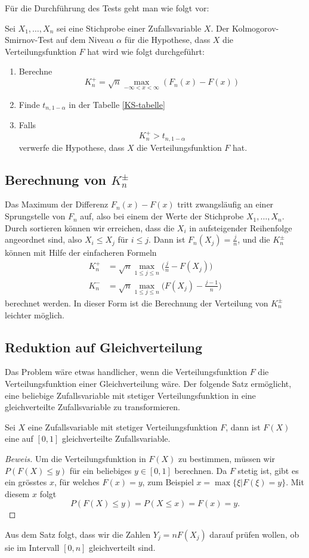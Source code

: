 Für die Durchführung des Tests geht man wie folgt vor:
\begin{satz} Sei $X_1,\dots,X_n$ sei eine Stichprobe einer Zufallsvariable $X$.
Der Kolmogorov-Smirnov-Test auf dem Niveau $\alpha$ für die Hypothese,
dass $X$ die Verteilungsfunktion $F$ hat wird wie folgt durchgeführt:
\begin{enumerate}
\item Berechne
\[
K_n^+ = \sqrt{n}\max_{-\infty<x<\infty} (F_n(x)-F(x))
\]
\item Finde $t_{n,1-\alpha}$ in der Tabelle \ref{KS-tabelle}
\item Falls
\[
K_n^+>t_{n,1-\alpha}
\]
verwerfe die Hypothese, dass $X$ die Verteilungsfunktion $F$ hat.
\end{enumerate}
\end{satz}

\subsection{Berechnung von \texorpdfstring{$K_n^{\pm}$}{Kn-plus-minus}}
Das Maximum der Differenz $F_n(x)-F(x)$ tritt zwangsläufig an einer
Sprungstelle von $F_n$ auf, also bei einem der Werte der Stichprobe
$X_1,\dots,X_n$.
Durch sortieren können wir erreichen, dass die
$X_i$  in aufsteigender Reihenfolge angeordnet sind, also $X_i\le X_j$
für $i\le j$.
Dann ist $F_n(X_j)=\frac{j}{n}$, und
die  $K_n^{\pm}$ können mit Hilfe der einfacheren Formeln
\begin{align}
K_n^+
&=
\sqrt{n}\max_{1\le j\le n}\biggl(\frac{j}{n}-F(X_j)\biggr)
\label{knp-berechnungs-formel}
\\
K_n^-
&=
\sqrt{n}\max_{1\le j\le n}\biggl(F(X_j)-\frac{j-1}n\biggr)
\end{align}
berechnet werden.
In dieser Form ist die Berechnung der
Verteilung von $K_n^{\pm}$ leichter möglich.

\subsection{Reduktion auf Gleichverteilung}
Das Problem wäre etwas handlicher, wenn die Verteilungsfunktion $F$
die Verteilungsfunktion einer Gleichverteilung wäre.
Der folgende Satz ermöglicht, eine
beliebige Zufallsvariable mit stetiger Verteilungsfunktion in eine
gleichverteilte Zufallsvariable zu transformieren.
\begin{satz}\label{reduktion-auf-gleichverteilung}
Sei $X$ eine Zufallsvariable mit stetiger Verteilungsfunktion $F$, dann
ist $F(X)$ eine auf $[0,1]$ gleichverteilte Zufallsvariable.
\end{satz}
\begin{proof}[Beweis]
Um die Verteilungsfunktion in $F(X)$ zu bestimmen, müssen wir $P(F(X)\le y)$
für ein beliebiges $y\in[0,1]$ berechnen.
Da $F$ stetig ist, gibt es ein
grösstes $x$, für welches $F(x)= y$, zum Beispiel
$x=\max\{\xi|F(\xi)= y\}$.
Mit diesem $x$ folgt
\[
P(F(X)\le y)=P(X\le x)=F(x)=y.
\]
\end{proof}
Aus dem Satz folgt, dass wir die Zahlen $Y_j=nF(X_j)$ darauf prüfen wollen,
ob sie im Intervall $[0,n]$ gleichverteilt sind.

